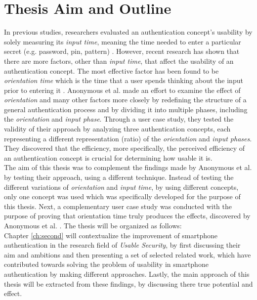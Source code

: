 \section{Thesis Aim and Outline}

In previous studies, researchers evaluated an authentication concept's usability by solely measuring its \textit{input time}, meaning the time needed to enter a particular secret (e.g. password, pin, pattern) \cite{anonymous}.
However, recent research has shown that there are more factors, other than \textit{input time}, that affect the usability of an authentication concept. The most effective factor has been found to be \textit{orientation time} which is the time that a user spends thinking about the input prior to entering it \cite{anonymous}. Anonymous et al. \cite{anonymous} made an effort to examine the effect of \textit{orientation} and many other factors more closely by redefining the structure of a general authentication process and by dividing it into multiple phases, including the \textit{orientation} and \textit{input phase}. Through a user case study, they tested the validity of their approach by analyzing three authentication concepts, each representing a different representation (ratio) of the \textit{orientation} and \textit{input phases}. They discovered that the efficiency, more specifically, the perceived efficiency of an authentication concept is crucial for determining how usable it is. \\

The aim of this thesis was to complement the findings made by Anonymous et al. by testing their approach, using a different technique. Instead of testing the different variations of \textit{orientation} and \textit{input time}, by using different concepts, only one concept was used which was specifically developed for the purpose of this thesis. Next, a complementary user case study was conducted with the purpose of proving that orientation time truly produces the effects, discovered by Anonymous et al. \cite{anonymous}. The thesis will be organized as follows: \\

Chapter \ref{ch:second} will contextualize the improvement of smartphone authentication in the research field of \textit{Usable Security}, by first discussing their aim and ambitions and then presenting a set of selected related work, which have contributed towards solving the problem of usability in smartphone authentication by making different approaches. Lastly, the main approach of this thesis will be extracted from these findings, by discussing there true potential and effect. \\

